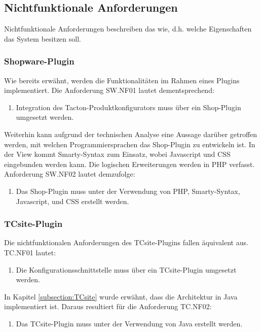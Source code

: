 \documentclass[12pt,a4paper,bibliography=totocnumbered,listof=totoc]{scrartcl}
\begin{document}
\subsection{Nichtfunktionale Anforderungen}
Nichtfunktionale Anforderungen beschreiben das \glqq wie\grqq{}, d.h. welche Eigenschaften das System besitzen soll.

\subsubsection{Shopware-Plugin}
Wie bereits erwähnt, werden die Funktionalitäten im Rahmen eines Plugins implementiert. Die Anforderung SW.NF01 lautet dementsprechend:
\begin{enumerate}[SW.NF01:]\bfseries
\item Integration des Tacton-Produktkonfigurators muss über ein Shop-Plugin umgesetzt werden.
\end{enumerate}
Weiterhin kann aufgrund der technischen Analyse eine Aussage darüber getroffen werden, mit welchen Programmiersprachen das Shop-Plugin zu entwickeln ist. In der View kommt Smarty-Syntax zum Einsatz, wobei Javascript und CSS eingebunden werden kann. Die logischen Erweiterungen werden in PHP verfasst. Anforderung SW.NF02 lautet demzufolge:
\begin{enumerate}[SW.NF02:]\bfseries
\item Das Shop-Plugin muss unter der Verwendung von PHP, Smarty-Syntax, Javascript, und CSS erstellt werden.
\end{enumerate}

\subsubsection{TCsite-Plugin}
Die nichtfunktionalen Anforderungen des TCsite-Plugins fallen äquivalent aus. TC.NF01 lautet:
\begin{enumerate}[TC.NF01:]\bfseries
\item Die Konfigurationsschnittstelle muss über ein TCsite-Plugin umgesetzt werden.
\end{enumerate}
In Kapitel \ref{subsection:TCsite} wurde erwähnt, dass die Architektur in Java implementiert ist. Daraus resultiert für die Anforderung TC.NF02:
\begin{enumerate}[TC.NF02:]\bfseries
\item Das TCsite-Plugin muss unter der Verwendung von Java erstellt werden.
\end{enumerate}

\pagebreak
\end{document}
